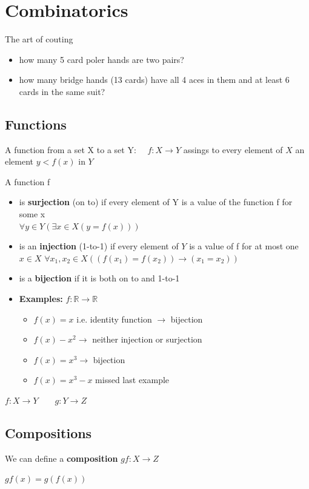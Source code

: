 \documentclass[9pt, letterpaper, oneside]{article}
\begin{document}
\section{Combinatorics}

The art of couting
\begin{itemize}
\item how many 5 card poler hands are two pairs?
\item how many bridge hands (13 cards) have all 4 aces in them and at least 6 cards in the same suit?
\end{itemize}

\subsection{Functions}
A function from a set X to a set Y: $\quad f: X \to Y$ assings to every element of $X$ an element $y < f(x)$ in $Y$

A function f
\begin{itemize}
    \item is \textbf{surjection} (on to) if every element of Y is a value of the function f for some x\\
    $\forall y \in Y (\exists x \in X (y = f(x)))$
    \item is an \textbf{injection} (1-to-1) if every element of $Y$ is a value of f for at most one $x \in X$
    $\forall x_1, x_2 \in X ((f(x_1) = f(x_2))\to(x_1 = x_2))$
    \item is a \textbf{bijection} if it is both on to and 1-to-1
    \item \textbf{Examples:} $f: \mathbb{R} \to \mathbb{R}$
    \begin{itemize}
        \item $f(x) = x$ i.e. identity function $\to$ bijection
        \item $f(x) - x^2 \to$ neither injection or surjection
        \item $f(x) = x^3 \to$ bijection
        \item $f(x) = x^3 - x $ missed last example
    \end{itemize} 
\end{itemize}
$f:X \to Y \qquad g: Y \to Z$

\subsection{Compositions}
We can define a \textbf{composition} $gf: X \to Z$

$gf (x) = g(f(x))$
\end{document}
